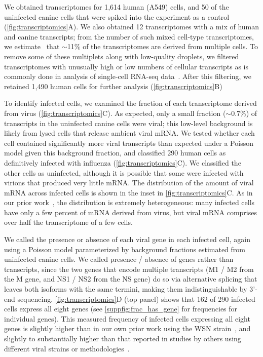\documentclass[]{asm-article}
\newcommand{\FIG}[1]{\autoref{fig:#1}}
\newcommand{\SUPPFIG}[1]{\autoref{suppfig:#1}}
\begin{document}
We obtained transcriptomes for 1,614 human (A549) cells, and 50 of the uninfected canine cells that were spiked into the experiment as a control (\FIG{transcriptomics}A).
We also obtained 12 transcriptomes with a mix of human and canine transcripts; from the number of such mixed cell-type transcriptomes, we estimate~\cite{bloom2018estimating} that $\sim$11\% of the transcriptomes are derived from multiple cells.
To remove some of these multiplets along with low-quality droplets, we filtered transcriptomes with unusually high or low numbers of cellular transcripts as is commonly done in analysis of single-cell RNA-seq data~\cite{haque2017practical}.
After this filtering, we retained 1,490 human cells for further analysis (\FIG{transcriptomics}B)

To identify infected cells, we examined the fraction of each transcriptome derived from virus (\FIG{transcriptomics}C).
As expected, only a small fraction ($\sim$0.7\%) of transcripts in the uninfected canine cells were viral; this low-level background is likely from lysed cells that release ambient viral mRNA.
We tested whether each cell contained significantly more viral transcripts than expected under a Poisson model given this background fraction, and classified 290 human cells as definitively infected with influenza (\FIG{transcriptomics}C).
We classified the other cells as uninfected, although it is possible that some were infected with virions that produced very little mRNA.
The distribution of the amount of viral mRNA across infected cells is shown in the inset in \FIG{transcriptomics}C.
As in our prior work~\cite{russell2018extreme}, the distribution is extremely heterogeneous: many infected cells have only a few percent of mRNA derived from virus, but viral mRNA comprises over half the transcriptome of a few cells.

We called the presence or absence of each viral gene in each infected cell, again using a Poisson model parameterized by background fractions estimated from uninfected canine cells.
We called presence / absence of genes rather than transcripts, since the two genes that encode multiple transcripts (M1 / M2 from the M gene, and NS1 / NS2 from the NS gene) do so via alternative splicing that leaves both isoforms with the same termini, making them indistinguishable by 3'-end sequencing.
\FIG{transcriptomics}D (top panel) shows that 162 of 290 infected cells express all eight genes (see \SUPPFIG{frac_has_gene} for frequencies for individual genes).
This measured frequency of infected cells expressing all eight genes is slightly higher than in our own prior work using the WSN strain~\cite{russell2018extreme}, and slightly to substantially higher than that reported in studies by others using different viral strains or methodologies~\cite{heldt2015single, brooke2013most, dou2017analysis, jacobs2019incomplete}. 
\end{document}
